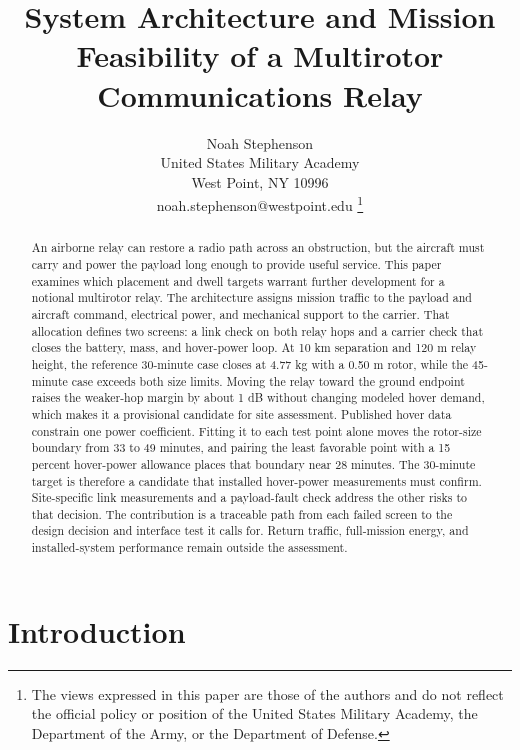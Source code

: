 \documentclass[twocolumn,letterpaper]{IEEEAerospaceCLS}
\begin{document}
\title{System Architecture and Mission Feasibility of a Multirotor Communications Relay}
\author{Noah Stephenson\\United States Military Academy\\West Point, NY 10996\\noah.stephenson@westpoint.edu
\thanks{The views expressed in this paper are those of the authors and do not reflect the official policy or position of the United States Military Academy, the Department of the Army, or the Department of Defense.}}
\maketitle
\thispagestyle{plain}\pagestyle{plain}
\begin{abstract}
An airborne relay can restore a radio path across an obstruction, but the aircraft must carry and power the payload long enough to provide useful service. This paper examines which placement and dwell targets warrant further development for a notional multirotor relay. The architecture assigns mission traffic to the payload and aircraft command, electrical power, and mechanical support to the carrier. That allocation defines two screens: a link check on both relay hops and a carrier check that closes the battery, mass, and hover-power loop. At 10 km separation and 120 m relay height, the reference 30-minute case closes at 4.77 kg with a 0.50 m rotor, while the 45-minute case exceeds both size limits. Moving the relay toward the ground endpoint raises the weaker-hop margin by about 1 dB without changing modeled hover demand, which makes it a provisional candidate for site assessment. Published hover data constrain one power coefficient. Fitting it to each test point alone moves the rotor-size boundary from 33 to 49 minutes, and pairing the least favorable point with a 15 percent hover-power allowance places that boundary near 28 minutes. The 30-minute target is therefore a candidate that installed hover-power measurements must confirm. Site-specific link measurements and a payload-fault check address the other risks to that decision. The contribution is a traceable path from each failed screen to the design decision and interface test it calls for. Return traffic, full-mission energy, and installed-system performance remain outside the assessment.
\end{abstract}
\tableofcontents

\section{Introduction}\label{sec:intro}
\end{document}
